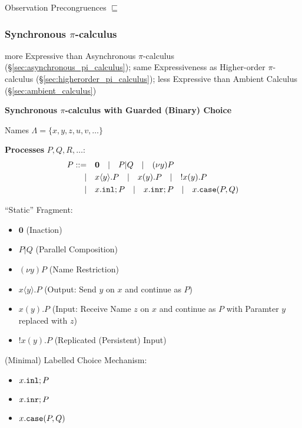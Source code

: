 Observation Precongruences $\sqsubseteq$



\subsubsection{Synchronous $\pi$-calculus}
\label{sec:synchronous_pi_calculus}

more Expressive than Asynchronous $\pi$-calculus
(\S\ref{sec:asynchronous_pi_calculus}); same Expressiveness as
Higher-order $\pi$-calculus (\S\ref{sec:higherorder_pi_calculus});
less Expressive than Ambient Calculus (\S\ref{sec:ambient_calculus})

\textbf{Synchronous $\pi$-calculus with Guarded (Binary) Choice}
\cite{caires-pfenning10}

Names $\Lambda = \{x,y,z,u,v,\ldots\}$

\textbf{Processes} $P, Q, R,\ldots$:
\cite{caires-pfenning10}
\[
\begin{split}
  P ::=&\quad \mathbf{0} \quad
      | \quad P|Q \quad
      | \quad (\nu y)P \quad \\
      |&\quad x\langle y \rangle.P \quad
      | \quad x(y).P \quad
      | \quad !x(y).P \quad \\
      |&\quad x.\mathtt{inl}; P \quad
      | \quad x.\mathtt{inr}; P \quad
      | \quad x.\mathtt{case}(P,Q)
\end{split}
\]

``Static'' Fragment:
\begin{itemize}
  \item $\mathbf{0}$ (Inaction)
  \item $P|Q$ (Parallel Composition)
  \item $(\nu y)P$ (Name Restriction)
\end{itemize}

\begin{itemize}
  \item $x\langle y \rangle.P$ (Output: Send $y$ on $x$ and continue
    as $P$)
  \item $x(y).P$ (Input: Receive Name $z$ on $x$ and continue as $P$
    with Paramter $y$ replaced with $z$)
  \item $!x(y).P$ (Replicated (Persistent) Input)
\end{itemize}

(Minimal) Labelled Choice Mechanism:
\begin{itemize}
  \item $x.\mathtt{inl}; P$
  \item $x.\mathtt{inr}; P$
  \item $x.\mathtt{case}(P,Q)$
\end{itemize}

